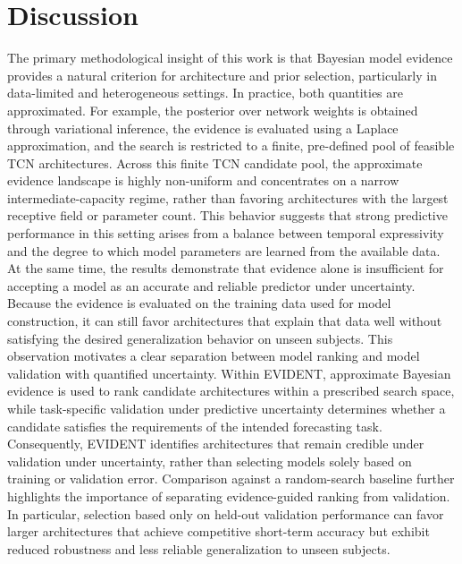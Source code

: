 \documentclass[preprint,12pt]{elsarticle}
\begin{document}
\section{Discussion}\label{sec:discussion}

The primary methodological insight of this work is that Bayesian model evidence provides a natural criterion for architecture and prior selection, particularly in data-limited and heterogeneous settings. In practice, both quantities are approximated. For example, the posterior over network weights is obtained through variational inference, the evidence is evaluated using a Laplace approximation, and the search is restricted to a finite, pre-defined pool of feasible TCN architectures.
Across this finite TCN candidate pool, the approximate evidence landscape is highly non-uniform and concentrates on a narrow intermediate-capacity regime, rather than favoring architectures with the largest receptive field or parameter count.
This behavior suggests that strong predictive performance in this setting arises from a balance between temporal expressivity and the degree to which model parameters are learned from the available data.
%
At the same time, the results demonstrate that evidence alone is insufficient for accepting a model as an accurate and reliable predictor under uncertainty. Because the evidence is evaluated on the training data used for model construction, it can still favor architectures that explain that data well without satisfying the desired generalization behavior on unseen subjects. This observation motivates a clear separation between model ranking and model validation with quantified uncertainty.
Within EVIDENT, approximate Bayesian evidence is used to rank candidate architectures within a prescribed search space, while task-specific validation under predictive uncertainty determines whether a candidate satisfies the requirements of the intended forecasting task. Consequently, EVIDENT identifies architectures that remain credible under validation under uncertainty, rather than selecting models solely based on training or validation error.
%
Comparison against a random-search baseline further highlights the importance of separating evidence-guided ranking from validation. In particular, selection based only on held-out validation performance can favor larger architectures that achieve competitive short-term accuracy but exhibit reduced robustness and less reliable generalization to unseen subjects.
\end{document}
